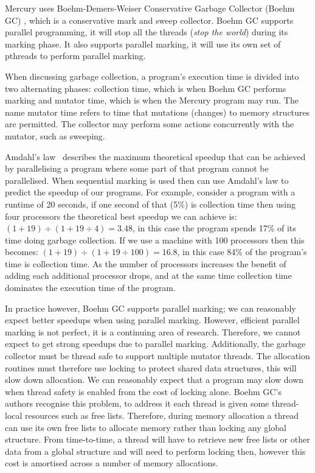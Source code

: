 Mercury uses Boehm-Demers-Weiser Conservative Garbage Collector (Boehm GC)
\citep{boehm_gc},
which is a conservative mark and sweep collector.
Boehm GC supports parallel programming,
it will stop all the threads (\emph{stop the world}) during its marking
phase.
It also supports parallel marking,
it will use its own set of pthreads to perform parallel marking.

When discussing garbage collection,
a program's execution time is divided into two alternating phases:
collection time, which is when Boehm GC performs marking
and mutator time, which is when the Mercury program may run.
The name mutator time refers to time that mutations (changes) to memory
structures are permitted.
The collector may perform some actions concurrently with the mutator,
such as sweeping.

Amdahl's law~\citep{amdahl} describes the maximum theoretical speedup that
can be achieved by parallelising a program where some part of that program
cannot be parallelised.
When sequential marking is used then can use Amdahl's
law to predict the speedup of our programs.
For example, consider a program with a runtime of 20 seconds,
if one second of that (5\%) is collection time
then using four processors the theoretical best speedup we can achieve is:
$(1 + 19) \div (1 + 19\div4) = 3.48$,
in this case the program spends 17\% of its time doing garbage collection.
If we use a machine with 100 processors then this becomes:
$(1 + 19) \div (1 + 19\div100) = 16.8$,
in this case 84\% of the program's time is collection time.
As the number of processors increases the benefit of adding each additional
processor drops,
and at the same time collection time dominates the execution time of the
program.

In practice however,
Boehm GC supports parallel marking;
we can reasonably expect better speedups when using parallel marking.
However,
efficient parallel marking is not perfect,
it is a continuing area of research.
Therefore,
we cannot expect to get strong speedups due to parallel marking.
Additionally,
the garbage collector must be thread safe to support multiple mutator
threads.
The allocation routines must therefore use locking to protect shared data
structures,
this will slow down allocation.
We can reasonably expect that a program may slow down when thread safety is
enabled from the cost of locking alone.
Boehm GC's authors recognise this problem,
to address it each thread is given some thread-local resources such as free
lists.
Therefore,
during memory allocation a thread can use its own free lists to allocate
memory rather than locking any global structure.
From time-to-time, a thread will have to retrieve new free lists or other
data from a global structure and will need to perform locking then,
however this cost is amortised across a number of memory allocations.

